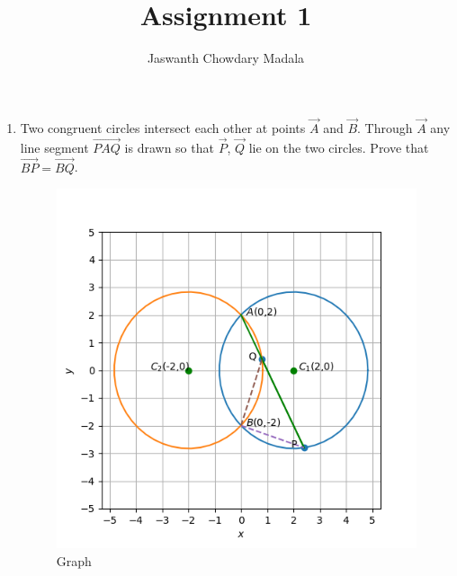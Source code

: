 \documentclass[journal,12pt,twocolumn]{IEEEtran}
\begin{document}
\vspace{3cm}


\title{Assignment 1}
\author{Jaswanth Chowdary Madala}





\maketitle

\newpage


\bigskip

\renewcommand{\thefigure}{\theenumi}
\renewcommand{\thetable}{\theenumi}


\begin{enumerate}
\item Two congruent circles intersect each other at points $\vec{A}$ and $\vec{B}$. Through $\vec{A}$ any line segment $\vec{PAQ}$ is drawn so that $\vec{P}$, $\vec{Q}$ lie on the two circles. Prove that $\vec{BP} = \vec{BQ}$.
\begin{figure}[ht]
\centering
\includegraphics[width = \columnwidth]{"./figs/fig.png"}
\caption{Graph}
\label{fig:1}
\end{figure}


\end{enumerate}
\end{document}
